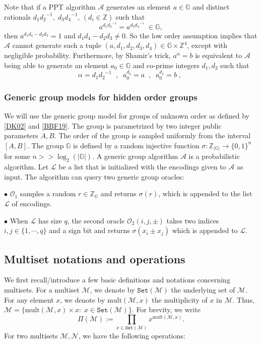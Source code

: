 \documentclass[11pt, lettersize, notitlepage, leqno, footskip=0.6cm]{article}
\newcommand{\bz}{\mathbb Z}
\newcommand{\pl}{\prod\limits}
\newcommand{\ttt}{\texttt}
\newcommand{\bG}{\mathbb{G}}
\newcommand{\sett}{\ttt{Set}}
\newcommand{\mult}{\mr{mult}}
\newcommand{\mul}{\mr{mult}}
\newcommand{\lra}{\longrightarrow}
\newcommand{\mc}{\mathcal}
\newcommand{\mb}{\mathbb}
\newcommand{\mr}{\mathrm}
\newcommand{\al}{\alpha}
\newcommand{\A}{\mc{A}}
\newcommand{\vs}{\vspace{-0.15cm}}
\newcommand{\noin}{\noindent}
\numberwithin{equation}{section}
\begin{document}
\noin Note that if a PPT algorithm $\A$ generates an element $a\in\mb{G}$ and distinct rationals ${d_1}{d_2}^{-1},\; {d_3}{d_4}^{-1}$, $(d_i\in\bz)$ such that \vs $$a^{{d_1}{d_2}^{-1}} = a^{{d_3}{d_4}^{-1}}\;\in\bG,$$ then $a^{d_1d_4-d_2d_3} = 1$ and $d_1d_4-d_2d_3\neq 0$. So the low order assumption implies that $\A$ cannot generate such a tuple $(a,d_1,d_2,d_3,d_4)\in \bG\times \bz^4$, except with negligible probability. Furthermore, by Shamir's trick, $a^{\al} = b$ is equivalent to $\A$ being able to generate an element $a_0\in\mb{G}$ and co-prime integers $d_1,d_2$ such that \vs $$\al = {d_1}{d_2}^{-1}\;\;,\;\;a_0^{d_2} =a\;\;,\;\; a_0^{d_1} =b\;,\; $$

\subsubsection{\fontsize{11}{11}\selectfont Generic group models for hidden order groups}

We will use the generic group model for groups of unknown order as defined by \hyperlink{DK02}{[DK02]} and \hyperlink{BBF19}{[BBF19]}. The group is parametrized by two integer public parameters $A, B$. The order of the group is sampled uniformly from  the interval $[A, B]$. The group $\bG$ is defined by a random injective function $\sigma: \bz_{|\bG|}\lra \{0, 1 \}^n$ for some $n>>\log_2(|\bG|)$. A generic group algorithm $\mc{A}$ is a probabilistic algorithm. Let $\mc{L}$ be a list that is initialized with the encodings given to $\A$ as input. The algorithm can query two generic group oracles: \vspace{0.1cm}

\noin $\bullet$ \hypertarget{Oracles}{$\mc{O}_1$} samples a random $r\in \bz_{\bG}$ and returns $\sigma(r)$, which is appended to the list $\mc{L}$ of encodings.

\noin $\bullet$ When $\mc{L}$ has size $q$, the second oracle $\mc{O}_2(i,j,\pm)$ takes two indices $i, j\in\{1,\cdots,q \}$ and a sign bit and returns $\sigma(x_i\pm x_j)$ which is appended to $\mc{L}$.


\subsection{\fontsize{11}{11}\selectfont Multiset notations and operations}


We first recall/introduce a few basic definitions and notations concerning multisets. For a multiset $\mc{M}$, we denote by $\sett(\mc{M})$ the underlying set of $\mc{M}$. For any element $x$, we denote by $\mul(\mc{M},x)$ the multiplicity of $x$ in $\mc{M}$. Thus, $\mc{M} = \{ \mult(\mc{M},x)\times x: \; x\in \sett(\mc{M})\}$. For brevity, we write \vs $$\Pi(\mc{M}):= \pl_{x\in \sett(\mc{M})} x^{\mult(\mc{M},x)}.$$ For two multisets $\mc{M}, \mc{N}$, we have the following operations:\vspace{0.1cm}
\end{document}
